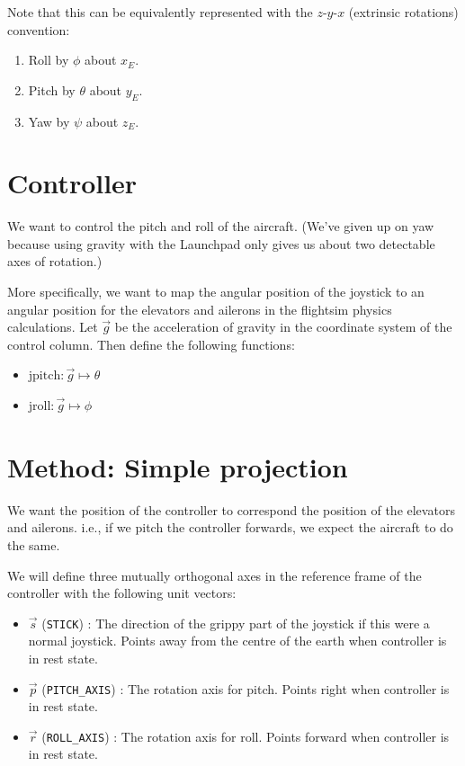 \documentclass[12pt]{article}
\begin{document}
	Note that this can be equivalently represented with the $z$-$y$-$x$ (extrinsic rotations) convention:
	\begin{enumerate}
		\item Roll by $\phi$ about $x_E$.		
		\item Pitch by $\theta$ about $y_E$.
		\item Yaw by $\psi$ about $z_E$.		
	\end{enumerate}
	
	\section{Controller}
	
	We want to control the pitch and roll of the aircraft. 
	(We've given up on yaw because using gravity with the Launchpad only gives us about two detectable axes of rotation.)
	
	More specifically, we want to map the angular position of the joystick to
	an angular position for the elevators and ailerons in the flightsim physics calculations. 
	Let $\vec{g}$ be the acceleration of gravity in the coordinate system of the control column.
	Then define the following functions:
	\begin{itemize}
		\item $\text{jpitch} : \vec{g} \mapsto \theta$
		\item $\text{jroll} : \vec{g} \mapsto \phi$
	\end{itemize}
	
	\section{Method: Simple projection}
	
	We want the position of the controller to correspond the position of the elevators and ailerons.
	i.e., if we pitch the controller forwards, we expect the aircraft to do the same. 
	
	We will define three mutually orthogonal axes in the reference frame of the controller with the following unit vectors:
	\begin{itemize}
		\item $\vec{s}$ (\verb|STICK|) : The direction of the grippy part of the joystick if this were a normal joystick. Points away from the centre of the earth when controller is in rest state.
		\item $\vec{p}$ (\verb|PITCH_AXIS|) : The rotation axis for pitch. Points right when controller is in rest state.
		\item $\vec{r}$ (\verb|ROLL_AXIS|) : The rotation axis for roll. Points forward when controller is in rest state.
	\end{itemize}
	
\end{document}
